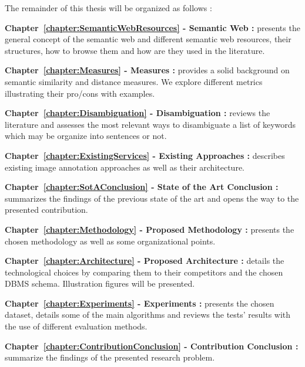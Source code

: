The remainder of this thesis will be organized as follows :
\begin{description}
\item\textbf{Chapter~\ref{chapter:SemanticWebResources} - Semantic Web :} presents the general concept of the semantic web and different semantic web resources, their structures, how to browse them and how are they used in the literature. 
\item\textbf{Chapter~\ref{chapter:Measures} - Measures :} provides a solid background on semantic similarity and distance measures. We explore different metrics illustrating their pro/cons with examples.
\item\textbf{Chapter~\ref{chapter:Disambiguation} - Disambiguation :} reviews the literature and assesses the most relevant ways to disambiguate a list of keywords which may be organize into sentences or not. 
\item\textbf{Chapter~\ref{chapter:ExistingServices} - Existing Approaches :} describes existing image annotation approaches as well as their architecture.
\item\textbf{Chapter~\ref{chapter:SotAConclusion} - State of the Art Conclusion :} summarizes the findings of the previous state of the art and opens the way to the presented contribution.
\item\textbf{Chapter~\ref{chapter:Methodology} - Proposed Methodology :} presents the chosen methodology as well as some organizational points.
\item\textbf{Chapter~\ref{chapter:Architecture} - Proposed Architecture :} details the technological choices by comparing them to their competitors and the chosen DBMS schema. Illustration figures will be presented.
\item\textbf{Chapter~\ref{chapter:Experiments} - Experiments :} presents the chosen dataset, details some of the main algorithms and reviews the tests' results with the use of different evaluation methods.
\item\textbf{Chapter~\ref{chapter:ContributionConclusion} - Contribution Conclusion :} summarize the findings of the presented research problem.
\end{description}